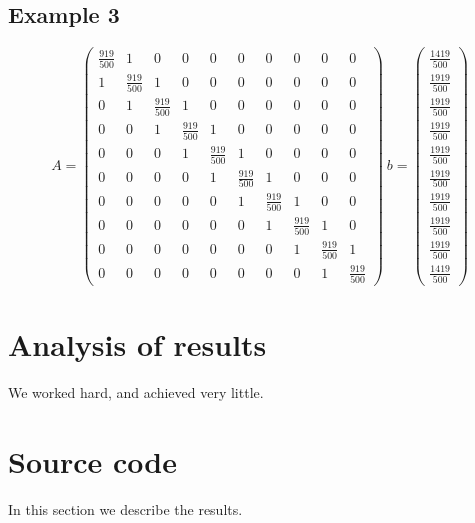 \documentclass[12pt]{article}
\begin{document}
\subsection{Example 3}
$$A = \left(\begin{array}{cccccccccc} \frac{919}{500} & 1 & 0 & 0 & 0 & 0 & 0 & 0 & 0 & 0\\ 1 & \frac{919}{500} & 1 & 0 & 0 & 0 & 0 & 0 & 0 & 0\\ 0 & 1 & \frac{919}{500} & 1 & 0 & 0 & 0 & 0 & 0 & 0\\ 0 & 0 & 1 & \frac{919}{500} & 1 & 0 & 0 & 0 & 0 & 0\\ 0 & 0 & 0 & 1 & \frac{919}{500} & 1 & 0 & 0 & 0 & 0\\ 0 & 0 & 0 & 0 & 1 & \frac{919}{500} & 1 & 0 & 0 & 0\\ 0 & 0 & 0 & 0 & 0 & 1 & \frac{919}{500} & 1 & 0 & 0\\ 0 & 0 & 0 & 0 & 0 & 0 & 1 & \frac{919}{500} & 1 & 0\\ 0 & 0 & 0 & 0 & 0 & 0 & 0 & 1 & \frac{919}{500} & 1\\ 0 & 0 & 0 & 0 & 0 & 0 & 0 & 0 & 1 & \frac{919}{500} \end{array}\right)\ 
b = \left(\begin{array}{c} \frac{1419}{500}\\ \frac{1919}{500}\\ \frac{1919}{500}\\ \frac{1919}{500}\\ \frac{1919}{500}\\ \frac{1919}{500}\\ \frac{1919}{500}\\ \frac{1919}{500}\\ \frac{1919}{500}\\ \frac{1419}{500} \end{array}\right)$$

\section{Analysis of results}
We worked hard, and achieved very little.

\section{Source code}
In this section we describe the results.


\end{document}
